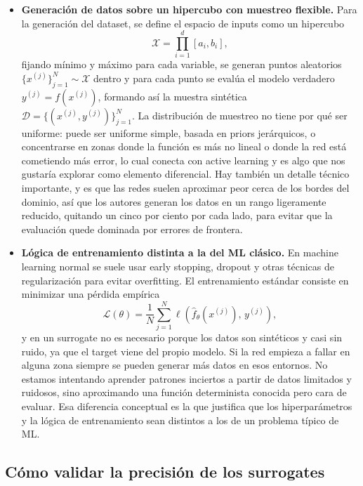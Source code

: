 \documentclass[11pt,a4paper]{article}
\begin{document}
\begin{itemize}
\item \textbf{Generación de datos sobre un hipercubo con muestreo flexible.} Para la generación del dataset, se define el espacio de inputs como un hipercubo
\begin{equation}
\mathcal{X} = \prod_{i=1}^{d} [a_i, b_i],
\end{equation}
fijando mínimo y máximo para cada variable, se generan puntos aleatorios $\{x^{(j)}\}_{j=1}^{N} \sim \mathcal{X}$ dentro y para cada punto se evalúa el modelo verdadero $y^{(j)} = f(x^{(j)})$, formando así la muestra sintética $\mathcal{D} = \{(x^{(j)}, y^{(j)})\}_{j=1}^{N}$. La distribución de muestreo no tiene por qué ser uniforme: puede ser uniforme simple, basada en priors jerárquicos, o concentrarse en zonas donde la función es más no lineal o donde la red está cometiendo más error, lo cual conecta con active learning y es algo que nos gustaría explorar como elemento diferencial. Hay también un detalle técnico importante, y es que las redes suelen aproximar peor cerca de los bordes del dominio, así que los autores generan los datos en un rango ligeramente reducido, quitando un cinco por ciento por cada lado, para evitar que la evaluación quede dominada por errores de frontera.

\item \textbf{Lógica de entrenamiento distinta a la del ML clásico.} En machine learning normal se suele usar early stopping, dropout y otras técnicas de regularización para evitar overfitting. El entrenamiento estándar consiste en minimizar una pérdida empírica
\begin{equation}
\mathcal{L}(\theta) = \frac{1}{N} \sum_{j=1}^{N} \ell\!\left(\hat{f}_\theta(x^{(j)}),\, y^{(j)}\right),
\end{equation}
y en un surrogate no es necesario porque los datos son sintéticos y casi sin ruido, ya que el target viene del propio modelo. Si la red empieza a fallar en alguna zona siempre se pueden generar más datos en esos entornos. No estamos intentando aprender patrones inciertos a partir de datos limitados y ruidosos, sino aproximando una función determinista conocida pero cara de evaluar. Esa diferencia conceptual es la que justifica que los hiperparámetros y la lógica de entrenamiento sean distintos a los de un problema típico de ML.
\end{itemize}

\subsection{Cómo validar la precisión de los surrogates}
\end{document}
